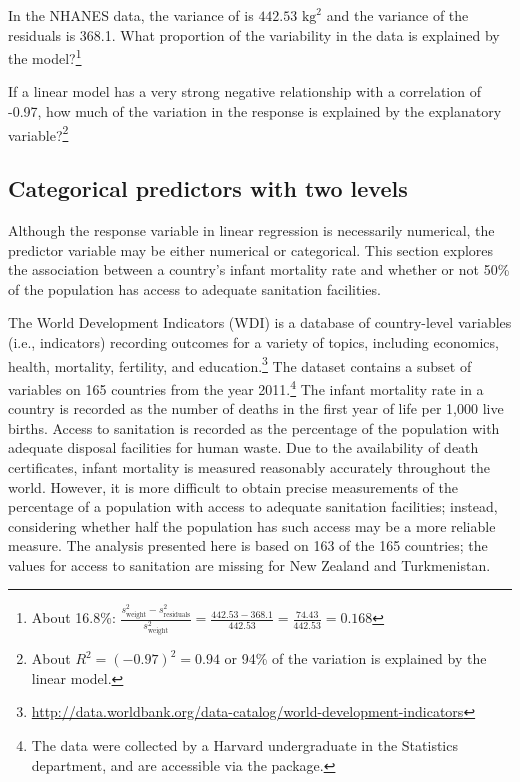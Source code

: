 \begin{exercise} In the NHANES data, the variance of  is $442.53$ $\text{kg}^2$ and the variance of the residuals is 368.1. What proportion of the variability in the data is explained by the model?\footnote{About 16.8\%: $\frac{s_{\text{weight}}^2 - s_{\text{residuals}}^2}{s_{\text{weight}}^2} = \frac{442.53 - 368.1}{442.53} = \frac{74.43}{442.53} = 0.168$}
\end{exercise}

\begin{exercise}
If a linear model has a very strong negative relationship with a correlation of -0.97, how much of the variation in the response is explained by the explanatory variable?\footnote{About $R^2 = (-0.97)^2 = 0.94$ or 94\% of the variation is explained by the linear model.}
\end{exercise}


\subsection{Categorical predictors with two levels}
\label{categoricalPredictorsWithTwoLevels}

Although the response variable in linear regression is necessarily numerical, the predictor variable may be either numerical or categorical. This section explores the association between a country's infant mortality rate and whether or not 50\% of the population has access to adequate sanitation facilities. 

The World Development Indicators (WDI) is a database of country-level variables (i.e., indicators) recording outcomes for a variety of topics, including economics, health, mortality, fertility, and education.\footnote{\url{http://data.worldbank.org/data-catalog/world-development-indicators}} The dataset  contains a subset of variables on 165 countries from the year 2011.\footnote{The data were collected by a Harvard undergraduate in the Statistics department, and are accessible via the  package.} The infant mortality rate in a country is recorded as the number of deaths in the first year of life per 1,000 live births. Access to sanitation is recorded as the percentage of the population with adequate disposal facilities for human waste. Due to the availability of death certificates, infant mortality is measured reasonably accurately throughout the world. However, it is more difficult to obtain precise measurements of the percentage of a population with access to adequate sanitation facilities; instead, considering whether half the population has such access may be a more reliable measure. The analysis presented here is based on 163 of the 165 countries; the values for access to sanitation are missing for New Zealand and Turkmenistan.

